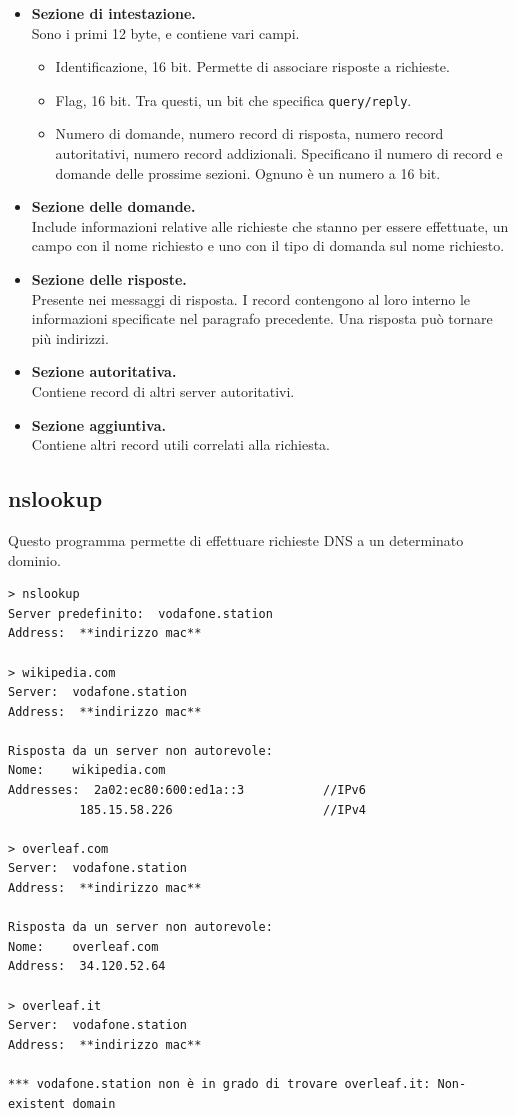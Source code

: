 \begin{itemize}
    \item \textbf{Sezione di intestazione.}\\
    Sono i primi 12 byte, e contiene vari campi.
    \begin{itemize}
        \item Identificazione, 16 bit. Permette di associare risposte a richieste.
        \item Flag, 16 bit. Tra questi, un bit che specifica \verb|query/reply|.
        \item Numero di domande, numero record di risposta, numero record autoritativi, numero record addizionali.
        Specificano il numero di record e domande delle prossime sezioni. Ognuno è un numero a 16 bit.
    \end{itemize}

    \item \textbf{Sezione delle domande.}\\
    Include informazioni relative alle richieste che stanno per essere effettuate, un campo con il nome richiesto e uno con il tipo di domanda sul nome richiesto.

    \item \textbf{Sezione delle risposte.}\\
    Presente nei messaggi di risposta. I record contengono al loro interno le informazioni specificate nel paragrafo precedente. Una risposta può tornare più indirizzi.

    \item \textbf{Sezione autoritativa.}\\
    Contiene record di altri server autoritativi.

    \item \textbf{Sezione aggiuntiva.}\\
    Contiene altri record utili correlati alla richiesta.
\end{itemize}

\newpage

\subsection{nslookup}
Questo programma permette di effettuare richieste DNS a un determinato dominio.
\begin{verbatim}
> nslookup
Server predefinito:  vodafone.station
Address:  **indirizzo mac**

> wikipedia.com
Server:  vodafone.station
Address:  **indirizzo mac**

Risposta da un server non autorevole:
Nome:    wikipedia.com
Addresses:  2a02:ec80:600:ed1a::3           //IPv6
          185.15.58.226                     //IPv4

> overleaf.com
Server:  vodafone.station
Address:  **indirizzo mac**

Risposta da un server non autorevole:
Nome:    overleaf.com
Address:  34.120.52.64                  

> overleaf.it
Server:  vodafone.station
Address:  **indirizzo mac**

*** vodafone.station non è in grado di trovare overleaf.it: Non-existent domain
\end{verbatim}

